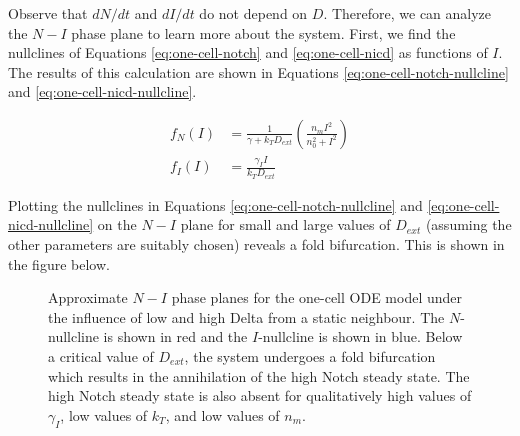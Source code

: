 \documentclass{article}
\begin{document}
\begin{flushleft}
Observe that $dN/dt$ and $dI/dt$ do not depend on $D$. Therefore, we can analyze the $N-I$ phase plane to learn more about the system. First, we find the nullclines of Equations \ref{eq:one-cell-notch} and \ref{eq:one-cell-nicd} as functions of $I$. The results of this calculation are shown in Equations \ref{eq:one-cell-notch-nullcline} and \ref{eq:one-cell-nicd-nullcline}.

\begin{align}
  \label{eq:one-cell-notch-nullcline}
  f_{N}(I) &= \frac{1}{\gamma + k_{T}D_{ext}}\left(\frac{n_{m}I^2}{n_{0}^2 + I^2}\right) \\[5pt]
  \label{eq:one-cell-nicd-nullcline}
  f_{I}(I) &= \frac{\gamma_{I}I}{k_{T}D_{ext}}
\end{align}

Plotting the nullclines in Equations \ref{eq:one-cell-notch-nullcline} and \ref{eq:one-cell-nicd-nullcline} on the $N-I$ plane for small and large values of $D_{ext}$ (assuming the other parameters are suitably chosen) reveals a fold bifurcation. This is shown in the figure below.

\begin{figure}[!htp]
  \label{fig:one-cell-phase-plane}
  \centering
  \caption{Approximate $N-I$ phase planes for the one-cell ODE model under the influence of low and high Delta from a static neighbour. The $N$-nullcline is shown in red and the $I$-nullcline is shown in blue. Below a critical value of $D_{ext}$, the system undergoes a fold bifurcation which results in the annihilation of the high Notch steady state. The high Notch steady state is also absent for qualitatively high values of $\gamma_{I}$, low values of $k_{T}$, and low values of $n_{m}$.}
\end{figure}


\end{flushleft}
\end{document}
